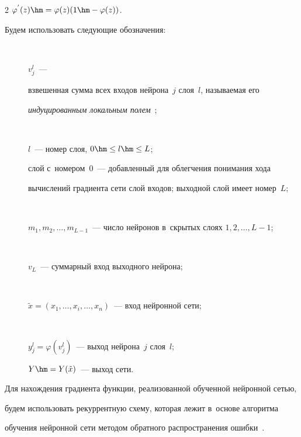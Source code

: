 \begin{multicols}{2}
$\varphi^{'}(z)\hm=\varphi(z)(1\hm-\varphi(z))$.





Будем использовать следующие обозначения:


\begin{description}


\item[\,] $v_j^l$~--- 


взвешенная сумма всех входов нейрона~$j$ слоя~$l$, называемая его 


\textit{индуцированным локальным полем}~\cite{14-don};


\item[\,]


$l$~--- номер слоя,  $0\hm\leq l \hm\leq L$; 


слой с~номером~0~--- добавленный для облегчения понимания хода 


вычислений градиента сети слой входов;  выходной слой имеет номер~$L$;


\item[\,]


$m_1,m_2,\dots,m_{L-1}$~--- число нейронов в~скрытых слоях $1,2,\dots,L-1$;


\item[\,]


$v_L$~--- суммарный вход выходного нейрона;


\item[\,]


$\tilde{x}=(x_1,\dots,x_i,\dots,x_n)$~--- вход нейронной сети;


\item[\,]


$y_j^{l}=\varphi(v_j^l)$~--- выход нейрона~$j$ слоя~$l$; 


$Y \hm= Y(\tilde{x})$~--- выход сети.


\end{description}





Для нахождения градиента функции, реализованной обученной нейронной сетью,  


будем использовать рекуррентную схему, которая лежит в~основе алгоритма 


обучения нейронной сети методом обратного распространения ошибки~\cite{14-don}.





 \renewcommand{\figurename}{\protect\bf Алгоритм}



\end{multicols}
